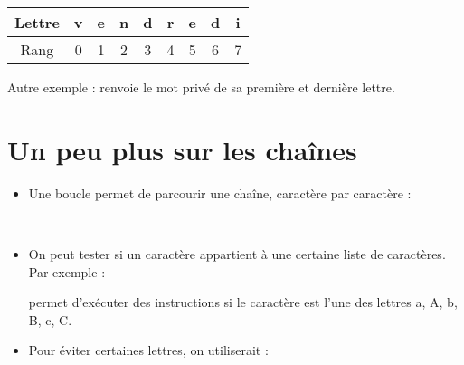\documentclass[12pt,class=report,crop=false]{standalone}
\begin{document}
    \bigskip

\begin{center}
\begin{tabular}{|c||c|c|c|c|c|c|c|c|}
\hline
Lettre & v & e & n & d & r & e & d & i \\ \hline
Rang   & 0 & 1 & 2 & 3 & 4 & 5 & 6 & 7\\ \hline
\end{tabular}
\end{center}
 
     \bigskip
     
Autre exemple :  renvoie le mot privé de sa première et dernière lettre.


\newpage


\section*{Un peu plus sur les chaînes}


\begin{itemize}
  \item Une boucle  permet de parcourir une chaîne, caractère par caractère :
  \begin{center}
  \begin{minipage}{0.4\textwidth}
  \\
  \indentation {}
  \end{minipage}
  \end{center}

  \bigskip

  \item On peut tester si un caractère appartient à une certaine liste de caractères. Par exemple : \\  
  \centerline{}
  
  permet d’exécuter des instructions si le caractère   est l'une des lettres a, A, b, B, c, C. 
  
    \bigskip
    
    \item 
  Pour éviter certaines lettres, on utiliserait : \\
  \centerline{}

  \end{itemize}  

\newpage
\end{document}
